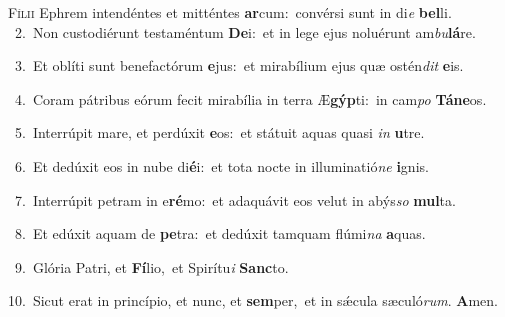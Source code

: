\lettrine{\initial\textcolor{\initialcolor}{F}}{ílii} Ephrem intendéntes et mitténtes \textbf{ar}\-cum:~\star convérsi sunt in di\textit{e} \textbf{bel}\-li.\\
{\numbfont\textcolor{\numbcolor}{~2.}}~Non custodiérunt testaméntum \textbf{De}\-i:~\star et in lege ejus noluérunt am\-\textit{bu}\-\textbf{lá}re.\par
{\numbfont\textcolor{\numbcolor}{~3.}}~Et oblíti sunt benefactórum \textbf{e}\-jus:~\star et mirabílium ejus quæ ostén\textit{dit} \textbf{e}\-is.\par
{\numbfont\textcolor{\numbcolor}{~4.}}~Coram pátribus eórum fecit mirabília in terra Æ\-\textbf{gýp}\-ti:~\star in cam\textit{po} \textbf{Tá}\-\textbf{ne}os.\par
{\numbfont\textcolor{\numbcolor}{~5.}}~Interrúpit mare, et perdúxit \textbf{e}\-os:~\star et státuit aquas quasi \textit{in} \textbf{u}\-tre.\par
{\numbfont\textcolor{\numbcolor}{~6.}}~Et dedúxit eos in nube di\-\textbf{é}\-i:~\star et tota nocte in illuminatió\textit{ne} \textbf{i}\-gnis.\par
{\numbfont\textcolor{\numbcolor}{~7.}}~Interrúpit petram in e\-\textbf{ré}\-mo:~\star et adaquávit eos velut in abýs\textit{so} \textbf{mul}\-ta.\par
{\numbfont\textcolor{\numbcolor}{~8.}}~Et edúxit aquam de \textbf{pe}\-tra:~\star et dedúxit tamquam flúmi\textit{na} \textbf{a}\-quas.\par
{\numbfont\textcolor{\numbcolor}{~9.}}~Glória Patri, et \textbf{Fí}\-lio,~\star et Spirítu\textit{i} \textbf{Sanc}\-to.\par
{\numbfont\textcolor{\numbcolor}{10.}}~Sicut erat in princípio, et nunc, et \textbf{sem}\-per,~\star et in sǽcula sæculó\-\textit{rum}\-. \textbf{A}\-men.\par
